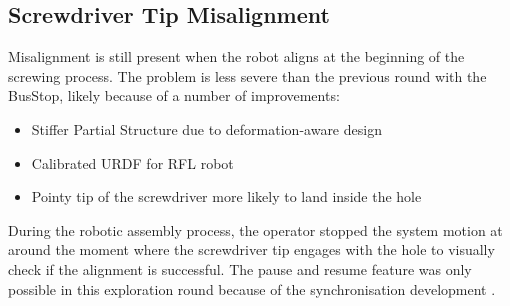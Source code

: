\subsection{Screwdriver Tip Misalignment}
\label{subsection:exploration-4-screwdriver-tip-misalignment}

Misalignment is still present when the robot aligns at the beginning of the screwing process. The problem is less severe than the previous round with the BusStop, likely because of a number of improvements:
\begin{itemize}
    \item Stiffer Partial Structure due to deformation-aware design\\
    \item Calibrated URDF for RFL robot 
    \item Pointy tip of the screwdriver more likely to land inside the hole
\end{itemize}

During the robotic assembly process, the operator stopped the system motion at around the moment where the screwdriver tip engages with the hole to visually check if the alignment is successful. The pause and resume feature was only possible in this exploration round because of the synchronisation development .


